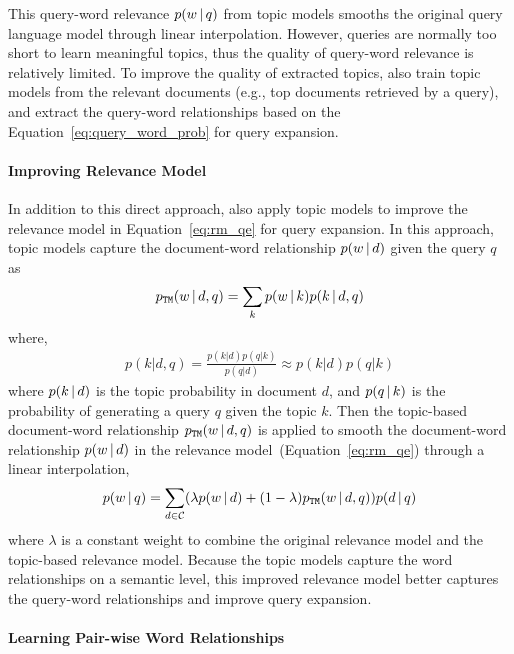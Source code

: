This query-word relevance $p(w \, | \, q)$ from topic models 
smooths the original query language model through linear
interpolation. However, queries are normally too short to learn
meaningful topics, thus the quality of query-word relevance is
relatively limited. To improve the quality of extracted topics,
\citet{Yi-2009} also train topic models from the relevant documents
(e.g., top documents retrieved by a query), and extract the query-word
relationships based on the Equation~\ref{eq:query_word_prob} for query
expansion.

\paragraph{Improving Relevance Model}

In addition to this direct approach, \citet{Yi-2009} also apply topic
models to improve the relevance model in Equation~\ref{eq:rm_qe} for
query expansion. In this approach, topic models capture
the document-word relationship $p(w \, | \, d)$ given the query $q$ as
\begin{align}
p_{\texttt{TM}}(w \, | \, d, q) = \sum_k p(w \, | \, k) p(k \, | \, d, q)
\end{align}
where,
\begin{align}
p(k|d,q) = \frac{p(k|d)p(q|k)}{p(q|d)} \approx p(k|d)p(q|k)
\end{align}
where $p(k \, | \, d)$ is the topic probability in document $d$, and $p(q
\, | \, k)$ is the probability of generating a query $q$ given the topic $k$. Then
the topic-based document-word relationship $p_{\texttt{TM}}(w \, | \, d, q)$ is
applied to smooth the document-word relationship $p(w \, | \, d)$ in the
relevance model~(Equation~\ref{eq:rm_qe}) through a linear
interpolation,
\begin{align}
p(w \, | \, q) = \sum_{d \in \mathcal{C}} (\lambda p(w \, | \, d) + (1 -
  \lambda)p_{\texttt{TM}}(w \, | \, d,q))p(d \, | \, q)
\end{align}
where $\lambda$ is a constant weight to combine the original relevance
model and the topic-based relevance model. Because the topic models
capture the word relationships on a semantic level, this improved
relevance model better captures the query-word relationships and
improve query expansion.

\paragraph{Learning Pair-wise Word Relationships}

